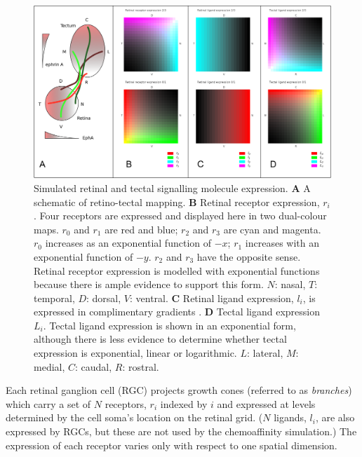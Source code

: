 \documentclass[11pt, a4paper, draft]{article}
\begin{document}
\begin{figure}
\includegraphics[width=\linewidth]{./images/expressions_fig.png}
\caption{Simulated retinal and tectal signalling molecule
expression. \textbf{A} A schematic of retino-tectal mapping.
%
\textbf{B} Retinal receptor expression, $r_i$. Four receptors are expressed and
displayed here in two dual-colour maps. $r_0$ and $r_1$ are red and blue;
$r_2$ and $r_3$ are cyan and magenta. $r_0$ increases as an exponential
function of $-x$; $r_1$ increases with an exponential function of $-y$. $r_2$
and $r_3$ have the opposite sense. Retinal receptor expression is modelled
with exponential functions because there is ample evidence to support this
form. $N$: nasal, $T$: temporal, $D$: dorsal, $V$: ventral.
%
\textbf{C} Retinal ligand expression, $l_i$, is expressed in complimentary
gradients \citep{hornberger_modulation_1999}.
%
\textbf{D} Tectal ligand expression $L_i$. Tectal ligand expression is shown
in an exponential form,
although there is less evidence to determine whether tectal expression is
exponential, linear or logarithmic.
$L$: lateral, $M$: medial, $C$: caudal, $R$: rostral.
}
\label{f:ex}
\end{figure}

Each retinal ganglion cell (RGC) projects growth cones (referred to
as \emph{branches}) which carry a set of $N$ receptors, $r_i$ indexed by $i$ and
expressed at levels determined by the cell soma's location on the
retinal grid. ($N$ ligands, $l_i$, are also expressed by RGCs, but these are not
used by the chemoaffinity simulation.) The expression of each receptor
varies only with respect to one spatial dimension.
\end{document}
